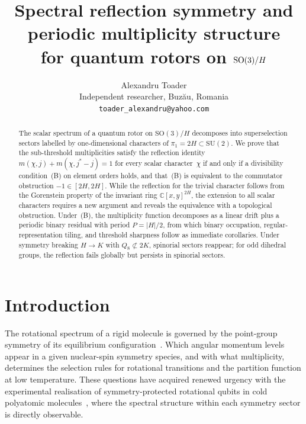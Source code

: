 \documentclass[12pt]{article}
\title{Spectral reflection symmetry and periodic multiplicity structure\\
for quantum rotors on $\SO(3)/H$}
\author{Alexandru Toader\\
Independent researcher, Buz\u{a}u, Romania\\
\texttt{toader\_alexandru@yahoo.com}}
\date{}
\theoremstyle{definition}
\theoremstyle{remark}
\newcommand{\CC}{\mathbb{C}}
\newcommand{\SU}{\mathrm{SU}}
\newcommand{\SO}{\mathrm{SO}}
\begin{document}
\maketitle

\begin{abstract}
The scalar spectrum of a quantum rotor on $\SO(3)/H$
decomposes into superselection sectors labelled by
one-dimensional characters of $\pi_1 = 2H \subset \SU(2)$.
We prove that the sub-threshold multiplicities satisfy the
reflection identity
$m(\chi,j) + m(\chi, j^*{-}j) = 1$
for every scalar character~$\chi$
if and only if a divisibility condition~(B) on element orders
holds, and that~(B) is equivalent to the commutator
obstruction $-1 \in [2H,2H]$.
While the reflection for the trivial character follows from
the Gorenstein property of the invariant ring
$\CC[x,y]^{2H}$, the extension to all scalar characters
requires a new argument and reveals the equivalence with a
topological obstruction.
Under~(B), the multiplicity function decomposes as a linear
drift plus a periodic binary residual with period $P = |H|/2$,
from which binary occupation, regular-representation tiling,
and threshold sharpness follow as immediate corollaries.
Under symmetry breaking $H \to K$ with $Q_8 \not\subset 2K$,
spinorial sectors reappear; for odd dihedral groups,
the reflection fails globally but persists in
spinorial sectors.
\end{abstract}

\section{Introduction}
\label{sec:intro}

The rotational spectrum of a rigid molecule is governed by
the point-group symmetry of its equilibrium
configuration~\cite{BunkerJensen2006,Zhilinskii2001,Koch2019}.
Which angular momentum levels appear in a given
nuclear-spin symmetry species, and with what multiplicity,
determines the selection rules for rotational transitions
and the partition function at low temperature.
These questions have acquired renewed urgency with the
experimental realisation of
symmetry-protected rotational qubits in cold polyatomic
molecules~\cite{Low2025}, where the spectral structure
within each symmetry sector is directly observable.
\end{document}

